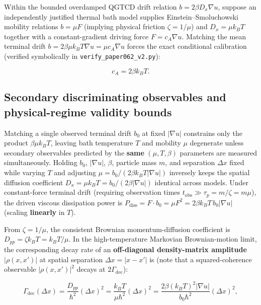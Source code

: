 \documentclass[
  american,
  11pt,
  letterpaper,
]{article}
\begin{document}
Within the bounded overdamped QGTCD drift relation \(b = 2\beta D_x \nabla u\), suppose an independently justified thermal bath model supplies Einstein--Smoluchowski mobility relations \(b = \mu F\) (implying physical friction \(\zeta = 1/\mu\)) and \(D_x = \mu k_B T\) together with a constant-gradient driving force \(F = c_A \nabla u\). Matching the mean terminal drift \(b = 2\beta \mu k_B T \nabla u = \mu c_A \nabla u\) forces the exact conditional calibration (verified symbolically in \nolinkurl{verify_paper062_v2.py}):

\begin{equation}
c_A = 2\beta k_B T.
\end{equation}

\subsection{Secondary discriminating observables and physical-regime validity bounds}\label{secondary-discriminating-observables-and-physical-regime-validity-bounds}

Matching a single observed terminal drift \(b_0\) at fixed \(|\nabla u|\) constrains only the product \(\beta \mu k_B T\), leaving bath temperature \(T\) and mobility \(\mu\) degenerate unless secondary observables predicted by the \textbf{same} \((\mu, T, \beta)\) parameters are measured simultaneously. Holding \(b_0\), \(|\nabla u|\), \(\beta\), particle mass \(m\), and separation \(\Delta x\) fixed while varying \(T\) and adjusting \(\mu = b_0 / (2\beta k_B T |\nabla u|)\) inversely keeps the spatial diffusion coefficient \(D_x = \mu k_B T = b_0/(2\beta|\nabla u|)\) identical across models. Under constant-force terminal drift (requiring observation times \(t_{\mathrm{obs}} \gg \tau_p = m/\zeta = m\mu\)), the driven viscous dissipation power is \(P_{\mathrm{diss}} = F \cdot b_0 = \mu F^2 = 2\beta k_B T\, b_0 |\nabla u|\) (scaling \textbf{linearly} in \(T\)).

From \(\zeta = 1/\mu\), the consistent Brownian momentum-diffusion coefficient is \(D_{pp} = \zeta k_B T = k_B T / \mu\). In the high-temperature Markovian Brownian-motion limit, the corresponding decay rate of an \textbf{off-diagonal density-matrix amplitude} \(|\rho(x, x')|\) at spatial separation \(\Delta x = |x - x'|\) is (note that a squared-coherence observable \(|\rho(x, x')|^2\) decays at \(2\Gamma_{\mathrm{dec}}\)):

\begin{equation}
\Gamma_{\mathrm{dec}}(\Delta x) = \frac{D_{pp}}{\hbar^2}(\Delta x)^2 = \frac{k_B T}{\mu \hbar^2}(\Delta x)^2 = \frac{2\beta (k_B T)^2 |\nabla u|}{b_0 \hbar^2}(\Delta x)^2,
\end{equation}
\end{document}
